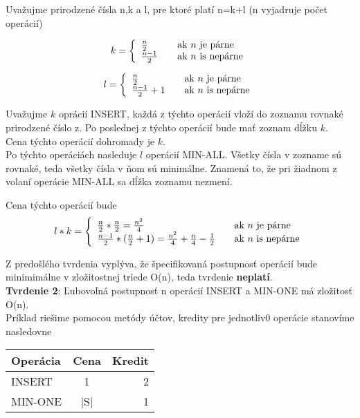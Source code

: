 \documentclass[paper=a4, fontsize=11pt]{scrartcl} %
\numberwithin{equation}{section} %
\numberwithin{figure}{section} %
\numberwithin{table}{section} %
\begin{document}
Uvažujme prirodzené čísla n,k a l, pre ktoré platí n=k+l (n vyjadruje počet operácií)

\[ k = \left\{ 
  \begin{array}{l l}
    \frac{n}{2} & \quad \text{ak $n$ je párne}\\
    \frac{n-1}{2} & \quad \text{ak $n$ is nepárne}
  \end{array} \right.\]

\[ l = \left\{ 
  \begin{array}{l l}
    \frac{n}{2} & \quad \text{ak $n$ je párne}\\
    \frac{n-1}{2} + 1 & \quad \text{ak $n$ is nepárne}
  \end{array} \right.\]


Uvažujme $k$ oprácií INSERT, každá z týchto operácií vloží do zoznamu rovnaké prirodzené číslo z.
Po poslednej z týchto operácií bude mať zoznam dĺžku $k$. \\

Cena týchto operácií dohromady je $k$. \\

Po týchto operáciách nasleduje $l$ operácií MIN-ALL.
Všetky čísla v zozname sú rovnaké, teda všetky čísla v ňom sú minimálne.
Znamená to, že pri žiadnom z volaní operácie MIN-ALL sa dĺžka zoznamu nezmení.


Cena týchto operácií bude 
\[ l*k = \left\{ 
  \begin{array}{l l}
    \frac{n}{2}* \frac{n}{2} = \frac{n^2}{4} & \quad \text{ak $n$ je párne}\\
    \frac{n-1}{2}* (\frac{n}{2} + 1) = \frac{n^2}{4} + \frac{n}{4} - \frac{1}{2} & \quad \text{ak $n$ is nepárne}
  \end{array} \right.\]

Z predošlého tvrdenia vyplýva, že špecifikovaná postupnosť operácií bude minimimálne v zložitostnej triede O(n), teda tvrdenie \textbf{neplatí}. \\

\textbf{Tvrdenie 2}: Ľubovoľná postupnosť n operácií INSERT  a MIN-ONE má zložitosť O(n). \\
Príklad riešime pomocou metódy účtov, kredity pre jednotliv0 operácie stanovíme nasledovne \\

  \begin{tabular}{ | l | c | r | }
    \hline
    Operácia & Cena & Kredit \\	
    \hline
    INSERT & 1 & 2 \\ 
    MIN-ONE & |S| & 1 \\
    \hline
  \end{tabular}\\
\end{document}
